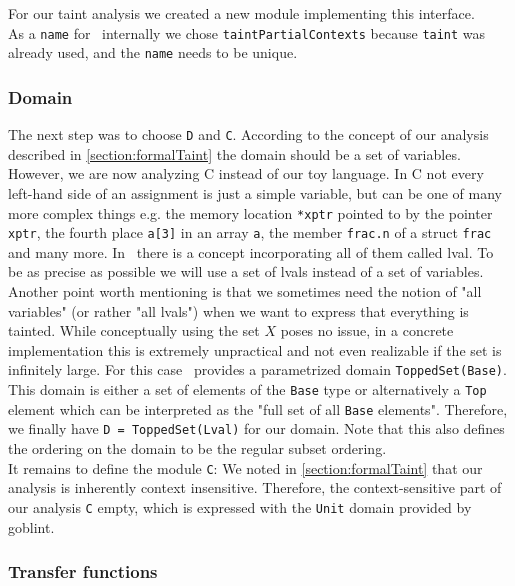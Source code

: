     For our taint analysis we created a new module implementing this interface.\\
    As a \texttt{name} for \gob\ internally we chose \texttt{taintPartialContexts} because \texttt{taint} was already used, and the \texttt{name} needs to be unique.
    \subsubsection{Domain}
      The next step was to choose \texttt{D} and \texttt{C}. According to the concept of our analysis described in \autoref{section:formalTaint} the domain should be a set of variables. However, we are now analyzing C instead of our toy language. In C not every left-hand side of an assignment is just a simple variable, but can be one of many more complex things e.g. the memory location \texttt{*xptr} pointed to by the pointer \texttt{xptr}, the fourth place \texttt{a[3]} in an array \texttt{a}, the member \texttt{frac.n} of a struct \texttt{frac} and many more. In \gob\ there is a concept incorporating all of them called \ac{lval}. To be as precise as possible we will use a set of \ac{lval}s instead of a set of variables.\\
      Another point worth mentioning is that we sometimes need the notion of "all variables" (or rather "all \ac{lval}s") when we want to express that everything is tainted. While conceptually using the set $X$ poses no issue, in a concrete implementation this is extremely unpractical and not even realizable if the set is infinitely large. For this case \gob\ provides a parametrized domain \texttt{ToppedSet(Base)}. This domain is either a set of elements of the \texttt{Base} type or alternatively a \texttt{Top} element which can be interpreted as the "full set of all \texttt{Base} elements". Therefore, we finally have \texttt{D = ToppedSet(Lval)} for our domain. Note that this also defines the ordering on the domain to be the regular subset ordering.\\
      It remains to define the module \texttt{C}: We noted in \autoref{section:formalTaint} that our analysis is inherently context insensitive. Therefore, the context-sensitive part of our analysis \texttt{C} empty, which is expressed with the \texttt{Unit} domain provided by goblint.


    \subsubsection{Transfer functions}

